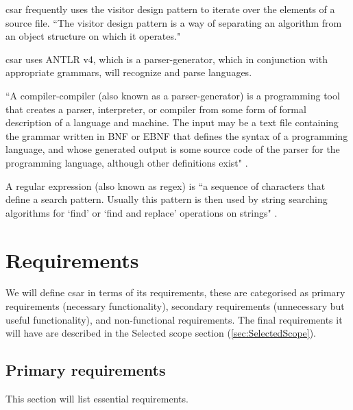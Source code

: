 \documentclass[12pt, letterpaper]{article}
\begin{document}
csar frequently uses the visitor design pattern to iterate over the elements of a source file.
``The visitor design pattern is a way of separating an algorithm from an object structure on which it operates." \autocite{wikipediavisitorpattern}

csar uses ANTLR v4, which is a parser-generator, which in conjunction with appropriate grammars, will recognize and parse languages.

``A compiler-compiler (also known as a parser-generator) is a programming tool that creates a parser, interpreter, or compiler from some form of formal description of a language and machine.
The input may be a text file containing the grammar written in BNF or EBNF that defines the syntax of a programming language, and whose generated output is some source code of the parser for the programming language, although other definitions exist" \autocite{wikipediacompilercompiler}.

A regular expression (also known as regex) is ``a sequence of characters that define a search pattern. Usually this pattern is then used by string searching algorithms for `find' or `find and replace' operations on strings" \autocite{wikipediaregex}.

\section{Requirements}
We will define csar in terms of its requirements, these are categorised as primary requirements (necessary functionality), secondary requirements (unnecessary but useful functionality), and non-functional requirements.
The final requirements it will have are described in the Selected scope section (\autoref{sec:SelectedScope}).

\subsection{Primary requirements}
\label{sec:PrimaryRequirements}
This section will list essential requirements.
\end{document}
